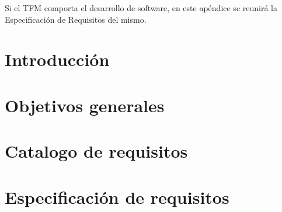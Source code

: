 
Si el TFM comporta el desarrollo de software, en este apéndice se reunirá la Especificación de Requisitos del mismo.

\section{Introducción}

\section{Objetivos generales}

\section{Catalogo de requisitos}

\section{Especificación de requisitos}


